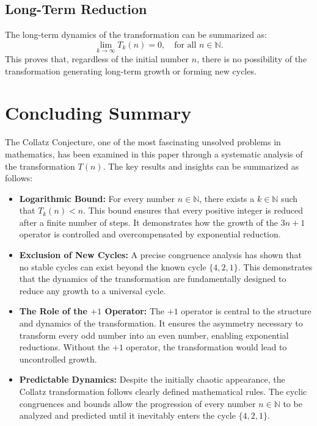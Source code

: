 \documentclass[a4paper,12pt]{article}
\begin{document}
\subsection{Long-Term Reduction}
The long-term dynamics of the transformation can be summarized as:
\[
\lim_{k \to \infty} T_k(n) = 0, \quad \text{for all } n \in \mathbb{N}.
\]
This proves that, regardless of the initial number \( n \), there is no possibility of the transformation generating long-term growth or forming new cycles.

\section{Concluding Summary}
The Collatz Conjecture, one of the most fascinating unsolved problems in mathematics, has been examined in this paper through a systematic analysis of the transformation \( T(n) \). The key results and insights can be summarized as follows:

\begin{itemize}
    \item \textbf{Logarithmic Bound:} For every number \( n \in \mathbb{N} \), there exists a \( k \in \mathbb{N} \) such that \( T_k(n) < n \). This bound ensures that every positive integer is reduced after a finite number of steps. It demonstrates how the growth of the \( 3n+1 \) operator is controlled and overcompensated by exponential reduction.
    \item \textbf{Exclusion of New Cycles:} A precise congruence analysis has shown that no stable cycles can exist beyond the known cycle \( \{4, 2, 1\} \). This demonstrates that the dynamics of the transformation are fundamentally designed to reduce any growth to a universal cycle.
    \item \textbf{The Role of the \(+1\) Operator:} The \(+1\) operator is central to the structure and dynamics of the transformation. It ensures the asymmetry necessary to transform every odd number into an even number, enabling exponential reductions. Without the \(+1\) operator, the transformation would lead to uncontrolled growth.
    \item \textbf{Predictable Dynamics:} Despite the initially chaotic appearance, the Collatz transformation follows clearly defined mathematical rules. The cyclic congruences and bounds allow the progression of every number \( n \in \mathbb{N} \) to be analyzed and predicted until it inevitably enters the cycle \( \{4, 2, 1\} \).
\end{itemize}
\end{document}
